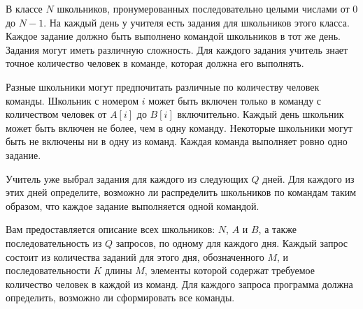 В классе $N$ школьников, пронумерованных последовательно целыми числами от $0$ до $N - 1$. На каждый день у учителя есть задания для школьников этого класса. Каждое задание должно быть выполнено командой школьников в тот же день. Задания могут иметь различную сложность. Для каждого задания учитель знает точное количество человек в команде, которая должна его выполнять.

Разные школьники могут предпочитать различные по количеству человек команды. Школьник с номером $i$ может быть включен только в команду с количеством человек от $A[i]$ до $B[i]$ включительно. Каждый день школьник может быть включен не более, чем в одну команду. Некоторые школьники могут быть не включены ни в одну из команд. Каждая команда выполняет ровно одно задание.

Учитель уже выбрал задания для каждого из следующих $Q$ дней. Для каждого из этих дней определите, возможно ли распределить школьников по командам таким образом, что каждое задание выполняется одной командой.

Вам предоставляется описание всех школьников: $N$, $A$ и $B$, а также последовательность из $Q$
 запросов, по одному для каждого дня. Каждый запрос состоит из количества заданий для этого
 дня, обозначенного $M$, и последовательности $K$ длины $M$, элементы которой содержат
 требуемое количество человек в каждой из команд. Для каждого запроса программа должна
 определить, возможно ли сформировать все команды.

